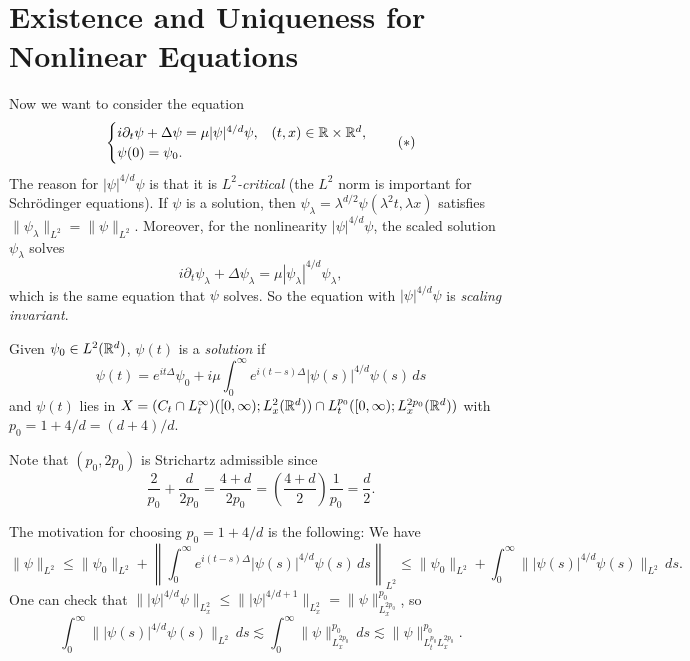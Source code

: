 \section{Existence and Uniqueness for Nonlinear Equations}

\begin{remark}
  Now we want to consider the equation
  \[
    \begin{cases}
      i \partial_t \psi + \Delta \psi = \mu |\psi|^{4 / d} \psi, & (t, x) \in \mathbb{R} \times \mathbb{R}^d, \\
      \psi(0) = \psi_0.
    \end{cases}
    \tag{$*$}
  \]
  The reason for
  $|\psi|^{4 / d} \psi$ is that it is
  \emph{$L^2$-critical} (the $L^2$ norm
  is important for Schr\"odinger equations).
  If $\psi$ is a solution, then
  $\psi_{\lambda} = \lambda^{d / 2} \psi(\lambda^2 t, \lambda x)$
  satisfies $\|\psi_{\lambda}\|_{L^2} = \|\psi\|_{L^2}$.
  Moreover, for the nonlinearity $|\psi|^{4 / d} \psi$, the scaled solution
  $\psi_\lambda$ solves
  \[
    i \partial_t \psi_\lambda + \Delta \psi_\lambda
    = \mu |\psi_\lambda|^{4 / d} \psi_\lambda,
  \]
  which is the same equation that $\psi$ solves.
  So the equation with $|\psi|^{4 / d} \psi$ is
  \emph{scaling invariant}.
\end{remark}

\begin{definition}\label{def:solution}
  Given $\psi_0 \in L^2(\mathbb{R}^d)$,
  $\psi(t)$ is a \emph{solution} if
  \[
    \psi(t) = e^{it\Delta} \psi_0
    + i \mu \int_0^\infty e^{i(t - s)\Delta}
    |\psi(s)|^{4 / d} \psi(s)\, ds
  \]
  and $\psi(t)$ lies in
  $X = (C_t \cap L^\infty_t)([0, \infty); L^2_x(\mathbb{R}^d)) \cap L^{p_0}_t([0, \infty); L^{2p_0}_x(\mathbb{R}^d))$
  with $p_0 = 1 + 4 / d = (d + 4) / d$.
\end{definition}

\begin{remark}
  Note that $(p_0, 2p_0)$ is Strichartz
  admissible since
  \[
    \frac{2}{p_0} + \frac{d}{2p_0}
    = \frac{4 + d}{2p_0}
    = \left(\frac{4 + d}{2}\right) \frac{1}{p_0}
    = \frac{d}{2}.
  \]
\end{remark}

\begin{remark}
  The motivation for choosing
  $p_0 = 1 + 4 / d$ is
  the following: We have
  \[
    \|\psi\|_{L^2}
    \le \|\psi_0\|_{L^2}
    + \left\|\int_0^\infty e^{i(t - s)\Delta} |\psi(s)|^{4 / d} \psi(s)\, ds\right\|_{L^2}
    \le \|\psi_0\|_{L^2}
    + \int_0^\infty \||\psi(s)|^{4 / d} \psi(s)\|_{L^2}\, ds.
  \]
  One can check that
  $\||\psi|^{4 / d} \psi\|_{L^2_x} \le \| |\psi|^{4 / d + 1} \|_{L^2_x} = \|\psi\|_{L^{2p_0}_x}^{p_0}$, so
  \[
    \int_0^\infty \||\psi(s)|^{4 / d} \psi(s)\|_{L^2}\, ds
    \lesssim
    \int_0^\infty \|\psi\|_{L^{2p_0}_x}^{p_0}\, ds
    \lesssim \|\psi\|_{L^{p_0}_t L^{2p_0}_x}^{p_0}.
  \]
\end{remark}

